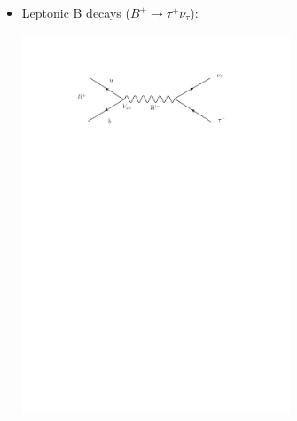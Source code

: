 \documentclass{beamer}
\begin{document}
{{  \vspace{0.1cm}
       \begin{itemize}
  \item \normalsize{Leptonic B decays ($B^{+} \rightarrow \tau^{+} \nu_{\tau}$):}
      \begin{center}
       \includegraphics[trim = 15mm 215mm 0mm 30mm, clip, width=8cm]{lepfeyn.pdf} 
       \end{center}
   \end{itemize}
  

}





}
\end{document}
